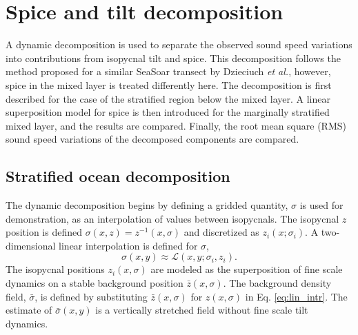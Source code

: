 \documentclass[preprint,NumberedRefs]{JASA}
\begin{document}

\section{\label{sec:decomposition}Spice and tilt decomposition}
A dynamic decomposition is used to separate the observed sound speed variations into contributions from isopycnal tilt and spice. This decomposition follows the method proposed for a similar SeaSoar transect by Dzieciuch \emph{et al.},\citep{dzieciuch2004} however, spice in the mixed layer is treated differently here. The decomposition is first described for the case of the stratified region below the mixed layer. A linear superposition model for spice is then introduced for the marginally stratified mixed layer, and the results are compared. Finally, the root mean square (RMS) sound speed variations of the decomposed components are compared.

\subsection{Stratified ocean decomposition}
The dynamic decomposition begins by defining a gridded quantity, $\sigma$ is used for demonstration, as an interpolation of values between isopycnals. The isopycnal $z$ position is defined $\sigma(x, z) = z^{-1}(x, \sigma)$ and discretized as $z_i(x; \sigma_i)$. A two-dimensional linear interpolation is defined for $\sigma$,
\begin{equation}
    \sigma(x,y)\approx\mathcal{L}(x, y; \sigma_i, z_i).
    \label{eq:lin_intr}
\end{equation}
The isopycnal positions $z_i(x, \sigma)$ are modeled as the superposition of fine scale dynamics on a stable background position $\bar{z}(x, \sigma)$. The background density field, $\bar{\sigma}$, is defined by substituting $\bar{z}(x, \sigma)$ for $z(x, \sigma)$ in Eq. \eqref{eq:lin_intr}. The estimate of $\bar{\sigma}(x,y)$ is a vertically stretched field without fine scale tilt dynamics.
\end{document}
